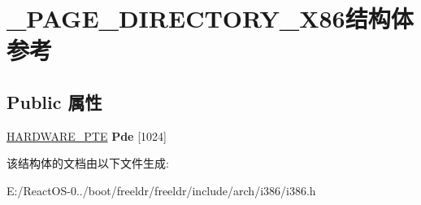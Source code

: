 \hypertarget{struct___p_a_g_e___d_i_r_e_c_t_o_r_y___x86}{}\section{\+\_\+\+P\+A\+G\+E\+\_\+\+D\+I\+R\+E\+C\+T\+O\+R\+Y\+\_\+\+X86结构体 参考}
\label{struct___p_a_g_e___d_i_r_e_c_t_o_r_y___x86}
\subsection*{Public 属性}
\begin{DoxyCompactItemize}
\item 
\mbox{\label{struct___p_a_g_e___d_i_r_e_c_t_o_r_y___x86_a8542097acb3fe1a9db403310f76c9548}} 
\hyperlink{struct___h_a_r_d_w_a_r_e___p_t_e}{H\+A\+R\+D\+W\+A\+R\+E\+\_\+\+P\+TE} {\bfseries Pde} \mbox{[}1024\mbox{]}
\end{DoxyCompactItemize}


该结构体的文档由以下文件生成\+:\begin{DoxyCompactItemize}
\item 
E\+:/\+React\+O\+S-\/0../boot/freeldr/freeldr/include/arch/i386/i386.\+h\end{DoxyCompactItemize}
